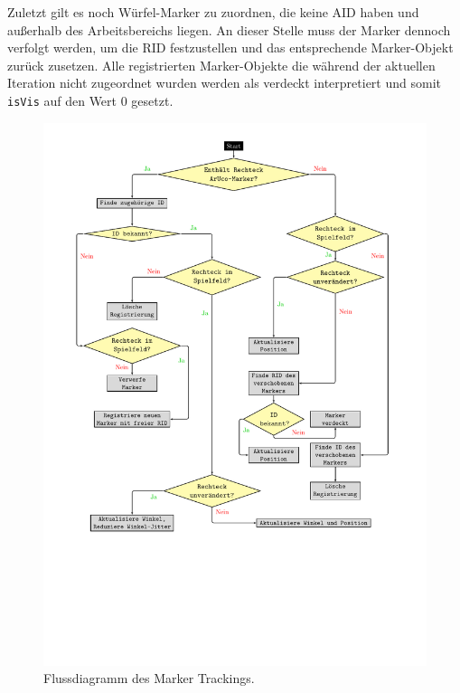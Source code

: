 Zuletzt gilt es noch Würfel-Marker zu zuordnen, die keine AID haben und außerhalb des Arbeitsbereichs liegen. An dieser Stelle muss der Marker dennoch verfolgt werden, um die RID festzustellen und das entsprechende Marker-Objekt zurück zusetzen. Alle registrierten Marker-Objekte die während der aktuellen Iteration nicht zugeordnet wurden werden als verdeckt interpretiert und somit \texttt{isVis} auf den Wert $0$ gesetzt.

\begin{figure}[htbp]
	\centering
	\includegraphics[scale=.8, trim=3cm 2.5cm 3.5cm 9 cm]{kapitel/system/MP_Marker_Erkennung.pdf}
	\caption{Flussdiagramm des Marker Trackings.}
	\label{fig:TrackingDiagram}
\end{figure}

